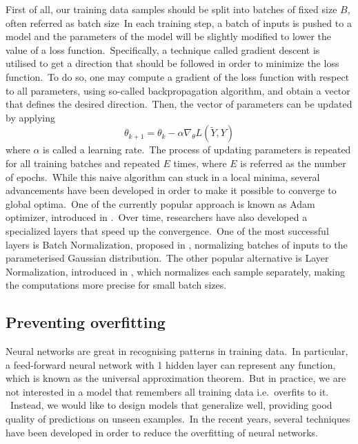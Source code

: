\documentclass[longabstract, english, mgr]{iithesis}
\theoremstyle{default_theorem_style}\newtheorem{theorem}{Theorem}
\theoremstyle{default_theorem_style}\newtheorem{definition}{Definition}
\begin{document}
\noindent First of all, our training data samples should be split into batches of fixed size $B$, often referred as
batch size\ In each training step, a batch of inputs is pushed to a model and the parameters of the model will
be slightly modified to lower the value of a loss function.\ Specifically, a technique called gradient descent is
utilised to get a direction that should be followed in order to minimize the loss function.\ To do so, one may compute
a gradient of the loss function with respect to all parameters, using so-called backpropagation algorithm, and obtain
a vector that defines the desired direction.\ Then, the vector of parameters can be updated by applying
$$
\theta_{k + 1} = \theta_k - \alpha \nabla_{\theta} L(\tilde{Y}, Y)
$$
where $\alpha$ is called a learning rate.\ The process of updating parameters is repeated for all training batches and
repeated $E$ times, where $E$ is referred as the number of epochs.\ While this naive algorithm can stuck in a
local minima, several advancements have been developed in order to make it possible to converge to global optima.\ One
of the currently popular approach is known as Adam optimizer, introduced in \cite{adam_optimizer}.\ Over time,
researchers have also developed a specialized layers that speed up the convergence.\ One of the most successful layers
is Batch Normalization, proposed in \cite{batch_normalization}, normalizing batches of inputs to the parameterised
Gaussian distribution.\ The other popular alternative is Layer Normalization, introduced
in \cite{layer_normalization}, which normalizes each sample separately, making the computations more precise for
small batch sizes.

\subsection{Preventing overfitting}\label{subsec:overfitting}

Neural networks are great in recognising patterns in training data.\ In particular, a feed-forward neural network with
1 hidden layer can represent any function, which is known as the universal approximation theorem.\ But in practice,
we are not interested in a model that remembers all training data i.e.\ overfits to it. \ Instead, we would like
to design models that generalize well, providing good quality of predictions on unseen examples.\ In the recent years,
several techniques have been developed in order to reduce the overfitting of neural networks.\newline
\end{document}
